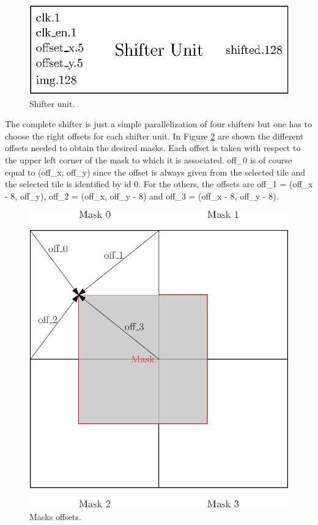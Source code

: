 \begin{figure}[H]
    \centering
    \includegraphics[scale=0.8]{Chapter4-GPU_CLKU/res/shifter_unit}
    \caption{Shifter unit.}
    \label{fig:gpu/shifter_unit}
\end{figure}

The complete shifter is just a simple parallelization of four shifters but one has to choose the right 
offsets for each shifter unit. In Figure \ref{fig:gpu/shifter_offsets} are shown
the different offsets needed to obtain the desired masks. Each offset is taken with respect to the 
upper left corner of the mask to which it is associated. off\_0 is of course equal to 
(off\_x, off\_y) since the offset is always given from the selected tile and the selected tile is 
identified by id 0. For the others, the offsets are off\_1 = (off\_x - 8, off\_y), off\_2 = 
(off\_x, off\_y - 8) and off\_3 = (off\_x - 8, off\_y - 8).

\begin{figure}[H]
    \centering
    \includegraphics[scale=1.0]{Chapter4-GPU_CLKU/res/shifter_offsets}
    \caption{Masks offsets.}
    \label{fig:gpu/shifter_offsets}
\end{figure}

